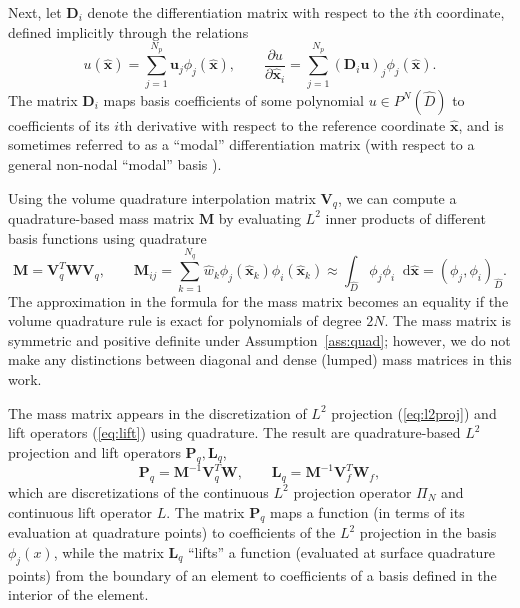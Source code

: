 \documentclass[10pt]{amsart}
\theoremstyle{definition}
\theoremstyle{lemma}
\theoremstyle{theorem}
\theoremstyle{assumption}
\renewcommand{\hat}{\widehat}
\newcommand{\pd}[2]{\frac{\partial#1}{\partial#2}}
\newcommand{\LRp}[1]{\left( #1 \right)}
\newcommand*\diff[1]{\mathop{}\!{\mathrm{d}#1}} %
\begin{document}
{Next, let ${\bm{D}}_i$ denote the differentiation matrix with respect to the $i$th coordinate, defined implicitly through the relations
\[
u(\hat{\bm{x}}) = \sum_{j=1}^{N_p} \bm{u}_j \phi_j(\hat{\bm{x}}), \qquad \pd{u}{\hat{\bm{x}}_i} = \sum_{j=1}^{N_p} \LRp{{\bm{D}}_i \bm{u}}_j\phi_j(\hat{\bm{x}}).
\]
The matrix ${\bm{D}}_i$ maps basis coefficients of some polynomial $u \in P^N\LRp{\hat{D}}$ to coefficients of its $i$th derivative with respect to the reference coordinate $\hat{\bm{x}}$, and is sometimes referred to as a ``modal'' differentiation matrix (with respect to a general non-nodal ``modal'' basis \cite{hicken2016multidimensional}).  

Using the volume quadrature interpolation matrix $\bm{V}_q$, we can compute a quadrature-based mass matrix $\bm{M}$ by evaluating $L^2$ inner products of different basis functions using quadrature
\[
  \bm{M} = \bm{V}_q^T\bm{W}\bm{V}_q, \qquad \bm{M}_{ij} = \sum_{k=1}^{N_q} \hat{w}_k \phi_j(\hat{\bm{x}}_k)\phi_i(\hat{\bm{x}}_k) \approx \int_{\hat{D}}\phi_j\phi_i \diff{\hat{\bm{x}}} = \LRp{\phi_j,\phi_i}_{\hat{D}}.
\]
The approximation in the formula for the mass matrix becomes an equality if the volume quadrature rule is exact for polynomials of degree $2N$.  The mass matrix is symmetric and positive definite under Assumption~\ref{ass:quad}; however, we do not make any distinctions between diagonal and dense (lumped) mass matrices in this work.  


The mass matrix appears in the discretization of $L^2$ projection (\ref{eq:l2proj}) and lift operators (\ref{eq:lift}) using quadrature.  The result are quadrature-based $L^2$ projection and lift operators $\bm{P}_q, \bm{L}_q$, 
\begin{equation}
\bm{P}_q = \bm{M}^{-1}\bm{V}_q^T\bm{W}, \qquad \bm{L}_q = \bm{M}^{-1}\bm{V}_f^T \bm{W}_f,
\label{eq:projlift}
\end{equation}
which are discretizations of the continuous $L^2$ projection operator $\Pi_N$ and continuous lift operator $L$.  The matrix $\bm{P}_q$ maps a function (in terms of its evaluation at quadrature points) to coefficients of the $L^2$ projection in the basis $\phi_j(x)$, while the matrix $\bm{L}_q$ ``lifts'' a function (evaluated at surface quadrature points) from the boundary of an element to coefficients of a basis defined in the interior of the element.  

}
\end{document}
